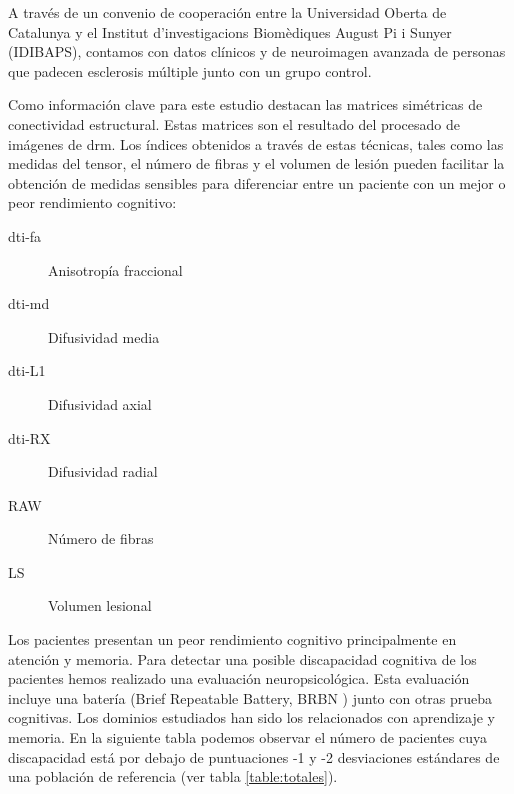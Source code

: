 A través de un convenio de cooperación entre la Universidad Oberta de Catalunya y el Institut d'investigacions Biomèdiques August Pi i Sunyer (IDIBAPS), contamos con datos clínicos y de neuroimagen avanzada de personas que padecen esclerosis múltiple junto con un grupo control.

Como información clave para este estudio destacan las matrices simétricas de conectividad estructural. Estas matrices son el resultado del procesado de imágenes de \gls{drm}. Los índices obtenidos a través de estas técnicas, tales como las medidas del tensor, el número de fibras y el volumen de lesión pueden facilitar la obtención de medidas sensibles para diferenciar entre un paciente con un mejor o peor rendimiento cognitivo:

\begin{description}
 \item [\gls{dti}-\gls{fa}] Anisotropía fraccional
 \item [\gls{dti}-\gls{md}] Difusividad media
 \item [\gls{dti}-L1] Difusividad axial
 \item [\gls{dti}-RX] Difusividad radial
 \item [RAW] Número de fibras
 \item [LS] Volumen lesional
\end{description}

Los pacientes presentan un peor rendimiento cognitivo principalmente en atención y memoria. Para detectar una posible discapacidad cognitiva de los pacientes hemos realizado una evaluación neuropsicológica. Esta evaluación incluye una batería (Brief Repeatable Battery, BRBN \cite{Boringa2001ThePractice}) junto con otras prueba cognitivas. Los dominios estudiados han sido los relacionados con aprendizaje y memoria. En la siguiente tabla podemos observar el número de pacientes cuya discapacidad está por debajo de puntuaciones -1 y -2 desviaciones estándares de una población de referencia (ver tabla \ref{table:totales}).

